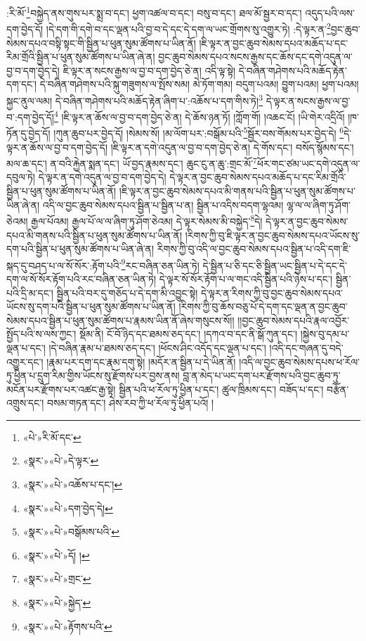 :རི་མོ་\footnote{«པེ་»རི་མོ་དང་}བསྐྱེད་ནས་གུས་པར་སྨྲ་བ་དང་། ཕྱག་འཚལ་བ་དང་། བསུ་བ་དང་། ཐལ་མོ་སྦྱར་བ་དང་། འདུད་པའི་ལས་དག་བྱེད་དོ། །དེ་དག་གི་དགེ་བ་དང་ལྡན་པའི་བྱ་བ་དེ་དང་དེ་དག་ལ་ཡང་གྲོགས་སུ་འགྱུར་ཏེ། :དེ་ལྟར་ན་\footnote{«སྣར་»«པེ་»དེ་ལྟར་}བྱང་ཆུབ་སེམས་དཔའ་བསྟི་སྟང་གི་སྦྱིན་པ་ཕུན་སུམ་ཚོགས་པ་ཡིན་ནོ། །ཇི་ལྟར་ན་བྱང་ཆུབ་སེམས་དཔའ་མཆོད་པ་དང་རིམ་གྲོའི་སྦྱིན་པ་ཕུན་སུམ་ཚོགས་པ་ཡིན་ཞེ་ན། བྱང་ཆུབ་སེམས་དཔའ་སངས་རྒྱས་དང་ཆོས་དང་དགེ་འདུན་ལ་བྱ་བ་དག་བྱེད་དེ། ཇི་ལྟར་ན་སངས་རྒྱས་ལ་བྱ་བ་དག་བྱེད་ཅེ་ན། འདི་ལྟ་སྟེ། དེ་བཞིན་གཤེགས་པའི་མཆོད་རྟེན་དག་དང་། དེ་བཞིན་གཤེགས་པའི་སྐུ་གཟུགས་ལ་སྤོས་སམ། མེ་ཏོག་གམ། བདུག་པའམ། བྱུག་པའམ། ཕྱག་པའམ། སྐྱང་ནུལ་ལམ། དེ་བཞིན་གཤེགས་པའི་མཆོད་རྟེན་ཞིག་པ་:འཆོས་པ་དག་གིས་ཏེ།\footnote{«སྣར་»«པེ་»འཆོས་པ་དང་།} དེ་ལྟར་ན་སངས་རྒྱས་ལ་བྱ་བ་:དག་བྱེད་དོ།\footnote{«སྣར་»«པེ་»དག་བྱེད་དེ།} །ཇི་ལྟར་ན་ཆོས་ལ་བྱ་བ་དག་བྱེད་ཅེ་ན། དེ་ཆོས་ཉན་ཏོ། །ཀློག་གོ། །འཆང་ངོ། །ཡི་གེར་འདྲིའོ། །ཁ་ཏོན་དུ་བྱེད་དོ། །ཀུན་ཆུབ་པར་བྱེད་དོ། །སེམས་སོ། །མ་ལོག་པར་:བསྒོམ་པའི་\footnote{«སྣར་»«པེ་»བསྒོམས་པའི་}སྦྱོར་བས་གོམས་པར་བྱེད་དེ། \footnote{«སྣར་»«པེ་»དོ། ། }དེ་ལྟར་ན་ཆོས་ལ་བྱ་བ་དག་བྱེད་དོ། །ཇི་ལྟར་ན་དགེ་འདུན་ལ་བྱ་བ་དག་བྱེད་ཅེ་ན། དེ་གོས་དང་། བསོད་སྙོམས་དང་། མལ་ཆ་དང་། ན་བའི་རྐྱེན་སྨན་དང་། ཡོ་བྱད་རྣམས་དང་། ཆུང་ངུ་ན་ཆུ་:གྲང་མོ་\footnote{«སྣར་»«པེ་»གྲང་}ཕོར་གང་ཙམ་ཡང་དགེ་འདུན་ལ་དབུལ་ཏེ། དེ་ལྟར་ན་དགེ་འདུན་ལ་བྱ་བ་དག་བྱེད་དེ། དེ་ལྟར་ན་བྱང་ཆུབ་སེམས་དཔའ་མཆོད་པ་དང་རིམ་གྲོའི་སྦྱིན་པ་ཕུན་སུམ་ཚོགས་པ་ཡིན་ནོ། །ཇི་ལྟར་ན་བྱང་ཆུབ་སེམས་དཔའ་མི་གནས་པའི་སྦྱིན་པ་ཕུན་སུམ་ཚོགས་པ་ཡིན་ཞེ་ན། འདི་ལ་བྱང་ཆུབ་སེམས་དཔའ་སྦྱིན་པ་སྦྱིན་པ་ན། སྦྱིན་པ་འདིས་བདག་ལྷའམ། ལྷ་ལ་ལ་ཞིག་ཏུ་ཤོག་ཅེའམ། རྒྱལ་པོའམ། རྒྱལ་པོ་ལ་ལ་ཞིག་ཏུ་ཤོག་ཅེའམ། དེ་ལྟར་སེམས་མི་བསྐྱེད་\footnote{«སྣར་»«པེ་»སྐྱེད་}དེ། དེ་ལྟར་ན་བྱང་ཆུབ་སེམས་དཔའ་མི་གནས་པའི་སྦྱིན་པ་ཕུན་སུམ་ཚོགས་པ་ཡིན་ནོ། །རིགས་ཀྱི་བུ་ཇི་ལྟར་ན་བྱང་ཆུབ་སེམས་དཔའ་ཡོངས་སུ་དག་པའི་སྦྱིན་པ་ཕུན་སུམ་ཚོགས་པ་ཡིན་ཞེ་ན། རིགས་ཀྱི་བུ་འདི་ལ་བྱང་ཆུབ་སེམས་དཔའ་སྦྱིན་པ་འདི་དག་ཇི་སྐད་དུ་བཤད་པ་ལ་སོ་སོར་:རྟོག་པའི་\footnote{«སྣར་»«པེ་»རྟོགས་པའི་}རང་བཞིན་ཅན་ཡིན་ཏེ། དེ་སྦྱིན་པ་ཅི་དང་ཅི་སྦྱིན་ཡང་སྦྱིན་པ་དེ་དང་དེ་དག་ལ་སོ་སོར་རྟོག་པའི་རང་བཞིན་ཅན་ཡིན་ཏེ། དེ་ལྟར་སོ་སོར་རྟོག་པ་ལ་གང་འདི་སྦྱིན་པའི་ཉེས་པ་དང་། སྦྱིན་པའི་དྲི་མ་དང་། སྦྱིན་པའི་བར་དུ་གཅོད་པ་དེ་དག་མི་འབྱུང་སྟེ། དེ་ལྟར་ན་རིགས་ཀྱི་བུ་བྱང་ཆུབ་སེམས་དཔའ་ཡོངས་སུ་དག་པའི་སྦྱིན་པ་ཕུན་སུམ་ཚོགས་པ་ཡིན་ནོ། །རིགས་ཀྱི་བུ་ཆོས་བཅུ་པོ་དེ་དག་དང་ལྡན་ན་བྱང་ཆུབ་སེམས་དཔའ་སྦྱིན་པ་ཕུན་སུམ་ཚོགས་པ་རྣམས་ཡིན་ནོ་ཞེས་གསུངས་སོ།། །།བྱང་ཆུབ་སེམས་དཔའི་རྣལ་འབྱོར་སྤྱོད་པའི་ས་ལས་ཀྱང་། སྡོམ་ནི། ངོ་བོ་ཉིད་དང་ཐམས་ཅད་དང་། །དཀའ་བ་དང་ནི་སྒོ་ཀུན་དང་། །སྐྱེས་བུ་དམ་པ་ལྡན་པ་དང་། །དེ་བཞིན་རྣམ་པ་ཐམས་ཅད་དང་། །ཕོངས་ཤིང་འདོད་དང་ལྡན་པ་དང་། །འདི་དང་གཞན་དུ་བདེ་འགྱུར་དང་། །རྣམ་པར་དག་དང་རྣམ་དགུ་སྟེ། །མདོར་ན་སྦྱིན་པ་དེ་ཡིན་ནོ། །འདི་ལ་བྱང་ཆུབ་སེམས་དཔས་ཕ་རོལ་ཏུ་ཕྱིན་པ་དྲུག་རིམ་གྱིས་ཡོངས་སུ་རྫོགས་པར་བྱས་ནས། བླ་ན་མེད་པ་ཡང་དག་པར་རྫོགས་པའི་བྱང་ཆུབ་ཏུ་མངོན་པར་རྫོགས་པར་འཚང་རྒྱ་སྟེ། སྦྱིན་པའི་ཕ་རོལ་ཏུ་ཕྱིན་པ་དང་། ཚུལ་ཁྲིམས་དང་། བཟོད་པ་དང་། བརྩོན་འགྲུས་དང་། བསམ་གཏན་དང་། ཤེས་རབ་ཀྱི་ཕ་རོལ་ཏུ་ཕྱིན་པའོ། །
